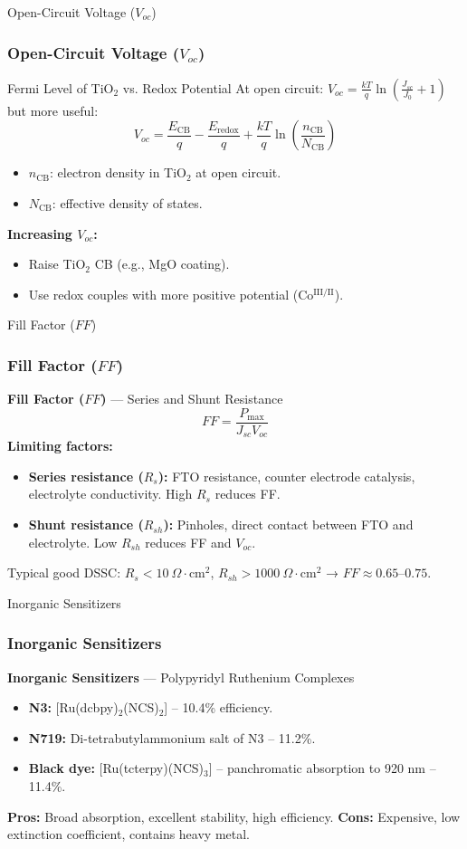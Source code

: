 \documentclass[aspectratio=169]{beamer}
\begin{document}
\begin{frame}{Open-Circuit Voltage ($V_{oc}$)}
\frametitle{Open-Circuit Voltage ($V_{oc}$)}

{Fermi Level of TiO$_2$ vs. Redox Potential}
At open circuit: $V_{oc} = \frac{kT}{q} \ln\left(\frac{J_{sc}}{J_0} + 1\right)$ but more useful:
\[
V_{oc} = \frac{E_{\text{CB}}}{q} - \frac{E_{\text{redox}}}{q} + \frac{kT}{q}\ln\left(\frac{n_{\text{CB}}}{N_{\text{CB}}}\right)
\]
\begin{itemize}
\item $n_{\text{CB}}$: electron density in TiO$_2$ at open circuit.
\item $N_{\text{CB}}$: effective density of states.
\end{itemize}
\textbf{Increasing $V_{oc}$:}
\begin{itemize}
\item Raise TiO$_2$ CB (e.g., MgO coating).
\item Use redox couples with more positive potential (Co$^{\text{III/II}}$).
\end{itemize}
\cite{Robertson2006}
\end{frame}


\begin{frame}{Fill Factor ($FF$)}
\frametitle{Fill Factor ($FF$)}

\textbf{Fill Factor ($FF$)} — Series and Shunt Resistance
\[
FF = \frac{P_{\max}}{J_{sc} V_{oc}}
\]
\textbf{Limiting factors:}
\begin{itemize}
\item \textbf{Series resistance ($R_s$):} FTO resistance, counter electrode catalysis, electrolyte conductivity. High $R_s$ reduces FF.
\item \textbf{Shunt resistance ($R_{sh}$):} Pinholes, direct contact between FTO and electrolyte. Low $R_{sh}$ reduces FF and $V_{oc}$.
\end{itemize}
Typical good DSSC: $R_s < 10\ \Omega\cdot$cm$^2$, $R_{sh} > 1000\ \Omega\cdot$cm$^2$ → $FF \approx 0.65–0.75$.
\cite{Snaith2007}
\end{frame}


\begin{frame}{Inorganic Sensitizers}
\frametitle{Inorganic Sensitizers}

\textbf{Inorganic Sensitizers} — Polypyridyl Ruthenium Complexes
\begin{itemize}
\item \textbf{N3:} [Ru(dcbpy)$_2$(NCS)$_2$] – 10.4\% efficiency.
\item \textbf{N719:} Di-tetrabutylammonium salt of N3 – 11.2\%.
\item \textbf{Black dye:} [Ru(tcterpy)(NCS)$_3$] – panchromatic absorption to 920 nm – 11.4\%.
\end{itemize}
\textbf{Pros:} Broad absorption, excellent stability, high efficiency.
\textbf{Cons:} Expensive, low extinction coefficient, contains heavy metal.
\cite{Nazeeruddin2005}
\end{frame}
\end{document}
